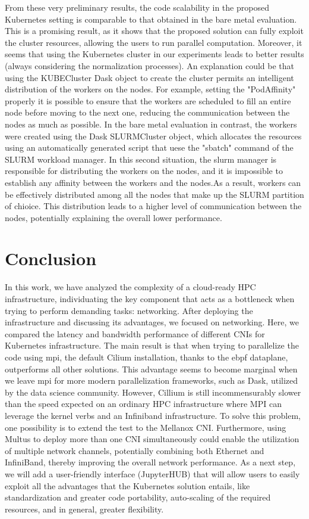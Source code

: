 From these very preliminary results, the code scalability in the proposed
Kubernetes setting is comparable to that obtained in the bare metal evaluation.
This is a promising result, as it shows that the proposed solution can fully
exploit the cluster resources, allowing the users to run parallel computation.
Moreover, it seems that using the Kubernetes cluster in our experiments leads to
better results (always considering the normalization processes). An explanation
could be that using the KUBECluster Dask object to create the cluster permits an
intelligent distribution of the workers on the nodes. For example, setting the
"PodAffinity" properly it is possible to ensure that the workers are scheduled
to fill an entire node before moving to the next one, reducing the communication
between the nodes as much as possible. In the bare metal evaluation in contrast,
the workers were created using the Dask SLURMCluster object, which allocates the
resources using an automatically generated script that uese the "sbatch" command
of the SLURM workload manager. In this second situation, the slurm manager is
responsible for distributing the workers on the nodes, and it is impossible to
establish any affinity between the workers and the nodes.As a result, workers
can be effectively distributed among all the nodes that make up the SLURM
partition of chioice. This distribution leads to a higher level of communication
between the nodes, potentially explaining the overall lower performance.

\section*{Conclusion}

In this work, we have analyzed the complexity of a cloud-ready HPC
infrastructure, individuating the key component that acts as a bottleneck when
trying to perform demanding tasks: networking.
After deploying the infrastructure and discussing its advantages, we focused on
networking. Here, we compared the latency and bandwidth performance of different
CNIs for Kubernetes infrastructure.
The main result is that when trying to parallelize the code using mpi, the
default Cilium installation, thanks to the ebpf dataplane, outperforms all other
solutions.
This advantage seems to become marginal when we leave mpi for more modern
parallelization frameworks, such as Dask, utilized by the data science
community.
However, Cillium is still incommensurably slower than the speed expected on an
ordinary HPC infrastructure where MPI can leverage the kernel verbs and an
Infiniband infrastructure.
To solve this problem, one possibility is to extend the test to the Mellanox CNI.
Furthermore, using Multus to deploy more than one CNI simultaneously could
enable the utilization of multiple network channels, potentially combining both
Ethernet and InfiniBand, thereby improving the overall network performance.
As a next step, we will add a user-friendly interface (JupyterHUB) that will
allow users to easily exploit all the advantages that the Kubernetes solution
entails, like standardization and greater code portability, auto-scaling of the
required resources, and in general, greater flexibility.
